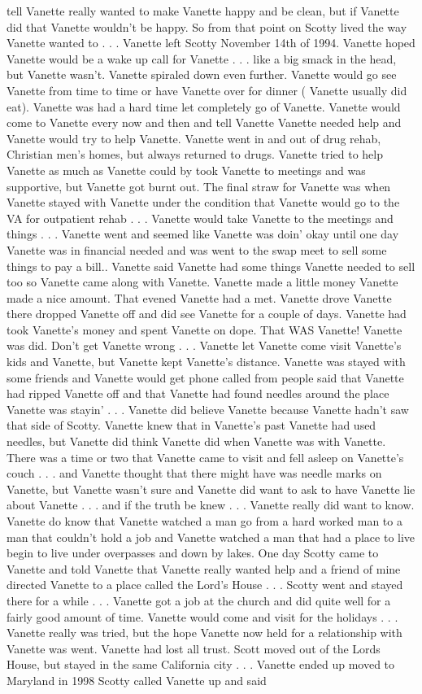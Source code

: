 \documentclass[12pt]{book}
\begin{document}
tell Vanette really wanted to make Vanette happy and be clean, but if Vanette did that Vanette wouldn't be happy. So from that point on Scotty lived the way Vanette wanted to  . . .  Vanette left Scotty November 14th of 1994. Vanette hoped Vanette would be a wake up call for Vanette  . . .  like a big smack in the head, but Vanette wasn't. Vanette spiraled down even further. Vanette would go see Vanette from time to time or have Vanette over for dinner ( Vanette usually did eat). Vanette was had a hard time let completely go of Vanette. Vanette would come to Vanette every now and then and tell Vanette Vanette needed help and Vanette would try to help Vanette. Vanette went in and out of drug rehab, Christian men's homes, but always returned to drugs. Vanette tried to help Vanette as much as Vanette could by took Vanette to meetings and was supportive, but Vanette got burnt out. The final straw for Vanette was when Vanette stayed with Vanette under the condition that Vanette would go to the VA for outpatient rehab  . . .  Vanette would take Vanette to the meetings and things  . . .  Vanette went and seemed like Vanette was doin' okay until one day Vanette was in financial needed and was went to the swap meet to sell some things to pay a bill.. Vanette said Vanette had some things Vanette needed to sell too so Vanette came along with Vanette. Vanette made a little money Vanette made a nice amount. That evened Vanette had a met. Vanette drove Vanette there dropped Vanette off and did see Vanette for a couple of days. Vanette had took Vanette's money and spent Vanette on dope. That WAS Vanette! Vanette was did. Don't get Vanette wrong  . . .  Vanette let Vanette come visit Vanette's kids and Vanette, but Vanette kept Vanette's distance. Vanette was stayed with some friends and Vanette would get phone called from people said that Vanette had ripped Vanette off and that Vanette had found needles around the place Vanette was stayin'  . . .  Vanette did believe Vanette because Vanette hadn't saw that side of Scotty. Vanette knew that in Vanette's past Vanette had used needles, but Vanette did think Vanette did when Vanette was with Vanette. There was a time or two that Vanette came to visit and fell asleep on Vanette's couch  . . .  and Vanette thought that there might have was needle marks on Vanette, but Vanette wasn't sure and Vanette did want to ask to have Vanette lie about Vanette  . . .  and if the truth be knew  . . .  Vanette really did want to know. Vanette do know that Vanette watched a man go from a hard worked man to a man that couldn't hold a job and Vanette watched a man that had a place to live begin to live under overpasses and down by lakes. One day Scotty came to Vanette and told Vanette that Vanette really wanted help and a friend of mine directed Vanette to a place called the Lord's House  . . .  Scotty went and stayed there for a while  . . .  Vanette got a job at the church and did quite well for a fairly good amount of time. Vanette would come and visit for the holidays . . .  Vanette really was tried, but the hope Vanette now held for a relationship with Vanette was went. Vanette had lost all trust. Scott moved out of the Lords House, but stayed in the same California city  . . .  Vanette ended up moved to Maryland in 1998 Scotty called Vanette up and said 
\end{document}
